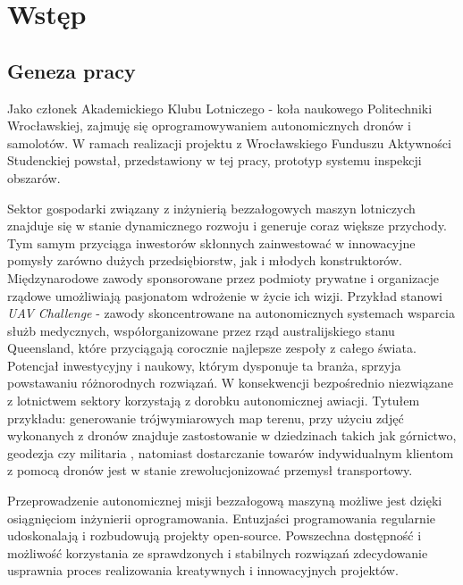 \chapter{Wstęp}


\section{Geneza pracy} \label{intro_genesis}

Jako członek Akademickiego Klubu Lotniczego - koła naukowego Politechniki Wrocławskiej,
zajmuję się oprogramowywaniem autonomicznych dronów i samolotów. W ramach realizacji
projektu z Wrocławskiego Funduszu Aktywności Studenckiej powstał, przedstawiony w
tej pracy, prototyp systemu inspekcji obszarów.

Sektor gospodarki związany z inżynierią bezzałogowych maszyn lotniczych znajduje się
w stanie dynamicznego rozwoju i generuje coraz większe przychody.
Tym samym przyciąga inwestorów skłonnych zainwestować w innowacyjne pomysły zarówno 
dużych przedsiębiorstw, jak i młodych konstruktorów. Międzynarodowe zawody sponsorowane
przez podmioty prywatne i organizacje rządowe umożliwiają pasjonatom wdrożenie w życie
ich wizji. Przykład stanowi \textit{UAV Challenge} - zawody skoncentrowane na
autonomicznych systemach wsparcia służb medycznych, współorganizowane przez rząd
australijskiego stanu Queensland, które przyciągają corocznie najlepsze zespoły z całego
świata\cite{uav_sponsors}. Potencjał inwestycyjny i naukowy, którym dysponuje ta branża,
sprzyja powstawaniu różnorodnych rozwiązań. W konsekwencji bezpośrednio niezwiązane z
lotnictwem sektory korzystają z dorobku autonomicznej awiacji. Tytułem przykładu: 
generowanie trójwymiarowych map terenu, przy użyciu zdjęć wykonanych z dronów znajduje
zastostowanie w dziedzinach takich jak górnictwo, geodezja czy militaria
\cite{uav_photogrametry}, natomiast dostarczanie towarów indywidualnym klientom z pomocą
dronów jest w stanie zrewolucjonizować przemysł transportowy.

Przeprowadzenie autonomicznej misji bezzałogową maszyną możliwe jest dzięki osiągnięciom
inżynierii oprogramowania. Entuzjaści programowania regularnie udoskonalają i rozbudowują
projekty open-source. Powszechna dostępność i możliwość korzystania ze sprawdzonych
i stabilnych rozwiązań zdecydowanie usprawnia proces realizowania
kreatywnych i innowacyjnych projektów. 


